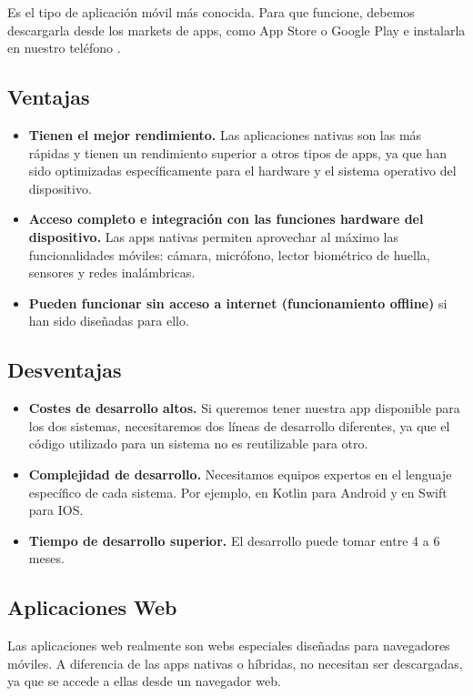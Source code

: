 Es el tipo de aplicación móvil más conocida. Para que funcione, debemos descargarla desde los markets de apps, como App Store o Google Play e instalarla en nuestro teléfono \cite{CitaA02}.

\subsection*{Ventajas}
\begin{itemize}
	\item \textbf{Tienen el mejor rendimiento.} Las aplicaciones nativas son las más rápidas y tienen un rendimiento superior a otros tipos de apps, ya que han sido optimizadas específicamente para el hardware y el sistema operativo del dispositivo.
	\item \textbf{Acceso completo e integración con las funciones hardware del dispositivo.} Las apps nativas permiten aprovechar al máximo las funcionalidades móviles: cámara, micrófono, lector biométrico de huella, sensores y redes inalámbricas.
	\item \textbf{Pueden funcionar sin acceso a internet (funcionamiento offline)} si han sido diseñadas para ello.
\end{itemize}

\subsection*{Desventajas}
\begin{itemize}
	\item \textbf{Costes de desarrollo altos.} Si queremos tener nuestra app disponible para los dos sistemas, necesitaremos dos líneas de desarrollo diferentes, ya que el código utilizado para un sistema no es reutilizable para otro.
	\item \textbf{Complejidad de desarrollo.} Necesitamos equipos expertos en el lenguaje específico de cada sistema. Por ejemplo, en Kotlin para Android y en Swift para IOS.
	\item \textbf{Tiempo de desarrollo superior.} El desarrollo puede tomar entre 4 a 6 meses.
\end{itemize}

\subsection{Aplicaciones Web}

Las aplicaciones web realmente son webs especiales diseñadas para navegadores móviles. A diferencia de las apps nativas o híbridas, no necesitan ser descargadas, ya que se accede a ellas desde un navegador web.

